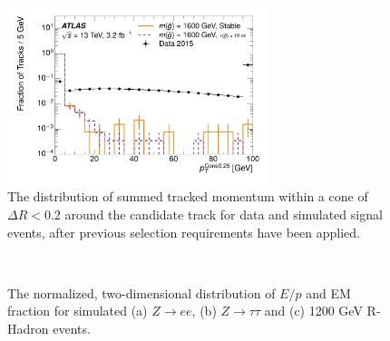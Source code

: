 \begin{figure}[h]
\centering
\includegraphics[width=0.68\textwidth]{figures/selection_isopt_nm1.pdf}
\caption{The distribution of summed tracked momentum within a cone of $\Delta R < 0.2$ around the candidate track for data and simulated signal events, after previous selection requirements have been applied.}
\label{fig:nm1_isopt}
\end{figure}

\begin{figure}[htb]
\centering
{}
\\
\caption{The normalized, two-dimensional distribution of $E/p$ and EM fraction for simulated (a) $Z\rightarrow ee$, (b) $Z\rightarrow \tau\tau$ and (c) 1200 GeV R-Hadron events.}
\label{fig:nm1_isopt}
\end{figure}


